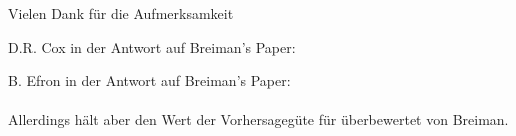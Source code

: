 \documentclass[compress]{beamer}
\begin{document}
\begin{frame}[plain]
  \addtocounter{framenumber}{-1}
  \begin{center}
    \Huge Vielen Dank für die Aufmerksamkeit
  \end{center}
\end{frame}




\begin{frame}[plain]
  \addtocounter{framenumber}{-1}
  D.R. Cox in der Antwort auf Breiman's Paper: \\
  \vspace{0.5cm}
\end{frame}


\begin{frame}[plain]
  \addtocounter{framenumber}{-1}
  B. Efron in der Antwort auf Breiman's Paper: \\
\vspace{0.5cm}
   \\
  Allerdings hält aber den Wert der Vorhersagegüte für überbewertet von Breiman. 

\end{frame}
\end{document}
